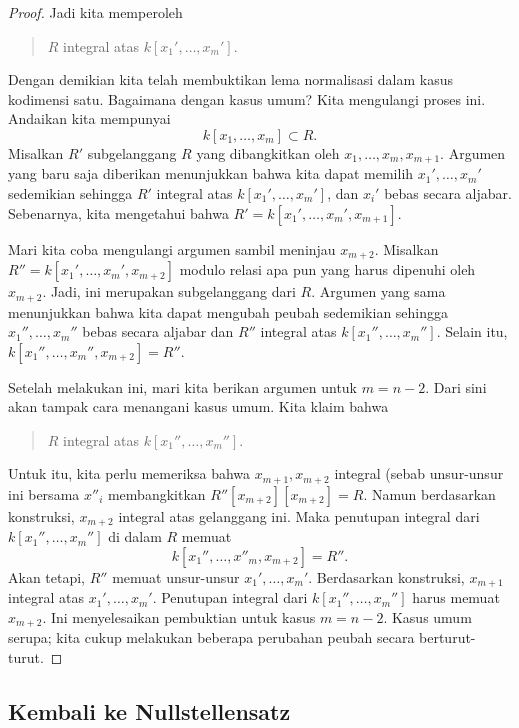 \begin{proof}
Jadi kita memperoleh
\begin{quote}
$R$ integral atas $k[x_1', \dots, x_m']$.
\end{quote}

Dengan demikian kita telah membuktikan lema normalisasi dalam kasus kodimensi satu. Bagaimana
dengan kasus umum? Kita mengulangi proses ini.
Andaikan kita mempunyai
\[ k[x_1, \dots, x_m] \subset R.  \]
Misalkan $R'$ subgelanggang $R$ yang dibangkitkan oleh $x_{1}, \dots,x_m, x_{m+1}$. Argumen
yang baru saja diberikan menunjukkan bahwa kita dapat memilih $x_1', \dots, x_m'$ sedemikian sehingga
$R'$ integral atas $k[x_1', \dots, x_m']$, dan $x_i'$
bebas secara aljabar.
Sebenarnya, kita mengetahui bahwa $R' = k[x_1', \dots, x_m', x_{m+1}]$.

Mari kita coba mengulangi argumen sambil meninjau $x_{m+2}$. Misalkan $R'' =
k[x_1', \dots, x_m', x_{m+2}]$ modulo relasi apa pun yang harus dipenuhi oleh $x_{m+2}$.
Jadi, ini merupakan subgelanggang dari $R$. Argumen yang sama menunjukkan bahwa kita dapat
mengubah peubah sedemikian sehingga $x_1'', \dots, x_m''$ bebas secara aljabar
dan $R''$ integral atas $k[x_1'', \dots, x_m'']$. Selain itu,
$k[x_1'', \dots, x_m'', x_{m+2}] = R''$.

Setelah melakukan ini, mari kita berikan argumen untuk $m=n-2$. Dari sini akan tampak
cara menangani kasus umum. Kita klaim bahwa
\begin{quote}
$R$ integral atas $k[x_1'', \dots, x_m'']$.
\end{quote}
Untuk itu, kita perlu memeriksa bahwa $x_{m+1}, x_{m+2}$ integral (sebab unsur-unsur ini
bersama $x''_i$ membangkitkan $R''[x_{m+2}][x_{m+2}]=R$.
Namun berdasarkan konstruksi, $x_{m+2}$ integral atas gelanggang ini. Maka penutupan integral dari
$k[x_1'', \dots, x_{m}'']$ di dalam $R$ memuat
\[ k[x_1'', \dots, x''_m, x_{m+2}] = R''.  \]
Akan tetapi, $R''$ memuat unsur-unsur $x_1', \dots, x_m'$. Berdasarkan konstruksi,
$x_{m+1}$ integral atas $x_1', \dots, x_m'$. Penutupan integral dari
$k[x_1'', \dots, x_{m}'']$ harus memuat $x_{m+2}$. Ini menyelesaikan pembuktian untuk
kasus $m=n-2$. Kasus umum serupa; kita cukup melakukan beberapa perubahan
peubah secara berturut-turut.

\end{proof}
\subsection{Kembali ke Nullstellensatz}

